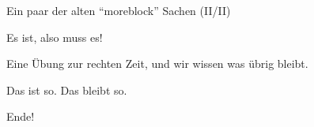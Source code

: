 \documentclass[
  ignorenonframetext,
]{beamer}
\begin{document}
\begin{frame}{Ein paar der alten ``moreblock'' Sachen (II/II)}
\protect\hypertarget{ein-paar-der-alten-moreblock-sachen-iiii}{}


\begin{definition}

Es ist, also muss es!

\end{definition}


\begin{Uebung}

Eine Übung zur rechten Zeit, und wir wissen was übrig bleibt.

\end{Uebung}


\begin{Fakt}

Das ist so. Das bleibt so.

\end{Fakt}

\end{frame}

\begin{frame}{Ende!}
\protect\hypertarget{ende}{}

\end{frame}
\end{document}
